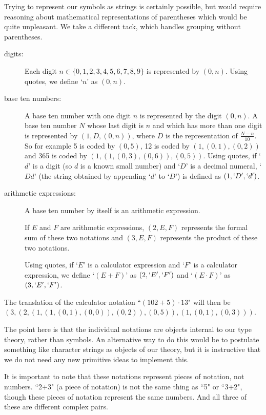 \documentclass[12pt]{book}
\begin{document}
Trying to represent our symbols as strings is certainly possible, but would require reasoning about
mathematical representations of parentheses which would be quite unpleasant.  We take a different tack,
which handles grouping without parentheses.

\begin{description}

\item[digits:]  Each digit $n \in \{0,1,2,3,4,5,6,7,8,9\}$ is represented by $(0,n)$.  Using quotes, we define `$n$' as $(0,n)$.

\item[base ten numbers:]  A base ten number with one digit $n$ is represented by the digit $(0,n)$.
A base ten number $N$ whose last digit is $n$ and which has more than one digit is represented by
$(1,D,(0,n))$, where $D$ is the representation of $\frac{N-n}{10}$.  So for example 5 is coded by $(0,5)$,
12 is coded by $(1,(0,1),(0,2))$ and 365 is coded by $(1,(1,(0,3),(0,6)),(0,5))$.  Using quotes, if `$d$' is a digit (so $d$ is a known small number)
and `$D$' is a decimal numeral, `$Dd$' (the string obtained by appending `$d$' to `$D$') is defined as $(1,`D',`d')$.

\item[arithmetic expressions:]  A base ten number by itself is an arithmetic expression.

If $E$ and $F$ are arithmetic expressions, $(2,E,F)$ represents the formal sum of these two notations 
and $(3,E,F)$ represents the product of these two notations.

Using quotes, if `$E$' is a calculator expression and `$F$' is a calculator expression, we define `$(E+F)$' as $(2,`E',`F')$ and `$(E \cdot F)$' as $(3,`E',`F')$.

\end{description}

The translation of the calculator notation ``$(102+5)\cdot 13$"  will then be $(3,(2,(1,(1,(0,1),(0,0)),(0,2)),(0,5)),(1,(0,1),(0,3)))$.

The point here is that the individual notations are objects internal to our type theory, rather than symbols.  An alternative way to do this would be to postulate something like character strings as objects of our theory, but it is instructive that we do not need any new primitive ideas to implement this.

It is important to note that these notations represent pieces of notation, not numbers.  ``2+3" (a piece of notation) is not the same thing as ``5" or ``3+2", though these pieces of notation represent the same numbers.  And all three of these are different complex pairs.
\end{document}
